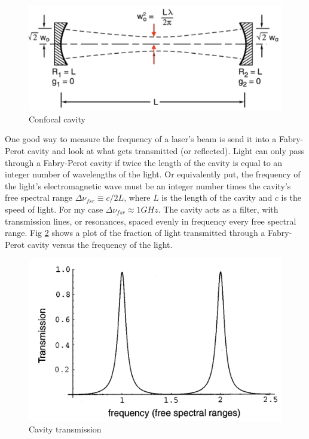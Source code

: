 \documentclass[11pt,A4Paper]{article}
\begin{document}
\begin{figure}[H]
    \centering
    \includegraphics[width = .8\textwidth]{confocalCavity.png}
    \caption{Confocal cavity}
    \label{fig:confocalCavity}
\end{figure}

One good way to measure the frequency of a laser's beam is send it into a Fabry-Perot cavity and look at what gets transmitted (or reflected). Light can only pass through a Fabry-Perot cavity if twice the length of the cavity is equal to an integer number of wavelengths of the light. Or equivalently put, the frequency of the light's electromagnetic wave must be an integer number times the cavity's free spectral range $\Delta \nu_{fsr} \equiv c/2L$, where $L$ is the length of the cavity and $c$ is the speed of light. For my case $\Delta \nu_{fsr} \approx 1GHz$. The cavity acts as a filter, with transmission lines, or resonances, spaced evenly in frequency every free spectral range. Fig \ref{fig:cavityTransmission}  shows a plot of the fraction of light transmitted through a Fabry-Perot cavity versus the frequency of the light. \cite{PDHintro}\cite{fundamentalsOfPhotonics}

\begin{figure}[H]
    \centering
    \includegraphics[width=.8\textwidth]{cavityTransmission.png}
    \caption{Cavity transmission}
    \label{fig:cavityTransmission}
\end{figure}
\end{document}
